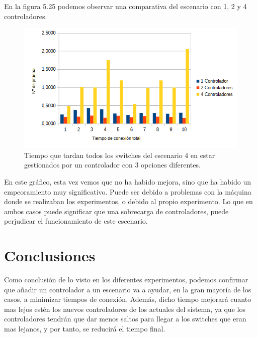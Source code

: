 \documentclass[a4paper, 12pt]{book}
\begin{document}
	
En la figura 5.25 podemos observar una comparativa del escenario con 1, 2 y 4 controladores.
	
	\begin{figure}[H]
		\centering
		\includegraphics[width=16cm, keepaspectratio]{img/comparativaFail}
		\caption{Tiempo que tardan todos los switches del escenario 4 en estar gestionados por un controlador con 3 opciones diferentes.}
		\label{figura:comparativaFail}
	\end{figure}
	
	En este gráfico, esta vez vemos que no ha habido mejora, sino que ha habido un empeoramiento muy  significativo. Puede ser debido a problemas con la máquina donde se realizaban los experimentos, o debido al propio experimento. Lo que en ambos casos puede significar que una sobrecarga de controladores, puede perjudicar el funcionamiento de este escenario.
	
	
	
	\clearpage
	\chapter{Conclusiones}
	\label{chap:conclusiones}
	
	Como conclusión de lo visto en los diferentes experimentos, podemos confirmar que añadir un controlador a un escenario va a ayudar, en la gran mayoría de los casos, a minimizar tiempos de conexión. Además, dicho tiempo mejorará cuanto mas lejos estén los nuevos controladores de los actuales del sistema, ya que los controladores tendrán que dar menos saltos para llegar a los switches que eran mas lejanos, y por tanto, se reducirá el tiempo final.  
	
\end{document}
